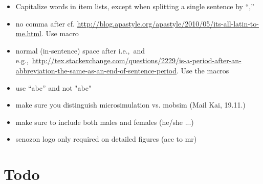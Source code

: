 \begin{itemize}
\item Capitalize words in item lists, except when splitting a single sentence by ``,''

\item no comma after cf. \url{http://blog.apastyle.org/apastyle/2010/05/its-all-latin-to-me.html}. Use macro \cf

\item normal (in-sentence) space after i.e.,\ and e.g.,\ \url{http://tex.stackexchange.com/questions/2229/is-a-period-after-an-abbreviation-the-same-as-an-end-of-sentence-period}. Use the macros \eg \ie 

\item use ``abc'' and not "abc"

\item make sure you distinguish  \gls{microsimulation} vs. \gls{mobsim} (Mail Kai, 19.11.)

\item make sure to include both males and females (he/she ...)

\item \gls{senozon} logo only required on detailed figures (acc to mr)

\end{itemize}

\vfill\eject

\section*{Todo}

